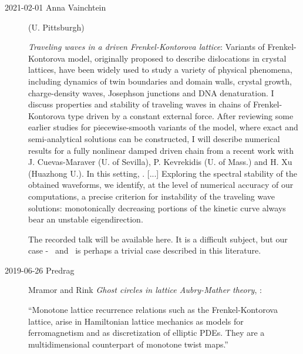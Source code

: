 \begin{description}


\item[2021-02-01 Anna Vainchtein] (U. Pittsburgh)

\emph{Traveling waves in a driven Frenkel-Kontorova lattice}:
Variants of Frenkel-Kontorova model, originally proposed to describe
dislocations in crystal lattices, have been widely used to study a
variety of physical phenomena, including dynamics of twin boundaries and
domain walls, crystal growth, charge-density waves, Josephson junctions
and DNA denaturation. I discuss properties and stability of traveling
waves in chains of Frenkel-Kontorova type driven by a constant external
force. After reviewing some earlier studies for piecewise-smooth variants
of the model, where exact and semi-analytical solutions can be
constructed, I will describe numerical results for a fully nonlinear
damped driven chain from a recent work with J. Cuevas-Maraver (U. of
Sevilla), P.  Kevrekidis (U. of Mass.) and H. Xu (Huazhong U.). In this
setting, . [...] Exploring the spectral stability of the obtained
waveforms, we identify, at the level of numerical accuracy of our
computations, a precise criterion for instability of the traveling wave
solutions: monotonically decreasing portions of the kinetic curve always
bear an unstable eigendirection.

The recorded talk will be available
 {here}.
It is a difficult subject, but our case - \eqva\ and \reqva\ is perhaps a
trivial case described in this literature.

\item[2019-06-26 Predrag]
Mramor and Rink
{\em Ghost circles in lattice {Aubry-Mather} theory}, :

``Monotone lattice recurrence relations such as the Frenkel-Kontorova
lattice, arise in Hamiltonian lattice mechanics as models for
ferromagnetism and as discretization of elliptic PDEs.
They are a multidimensional counterpart of monotone twist maps.''


\end{description}
